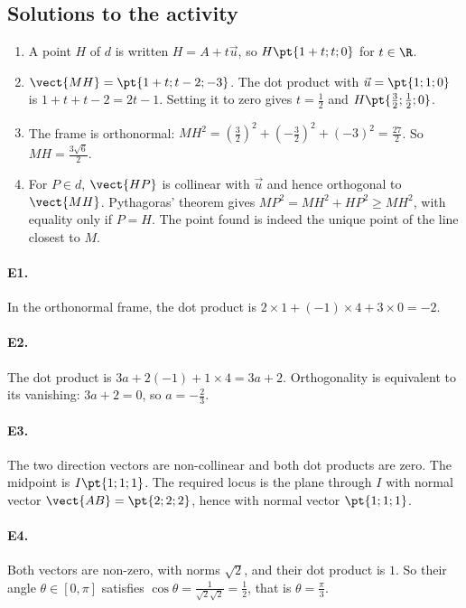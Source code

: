 \subsection{Solutions to the activity}\begin{enumerate}
\item A point $H$ of $d$ is written $H=A+t\vec u$, so $H\pt{1+t;t;0}$ for $t\in\R$.
\item $\vect{MH}=\pt{1+t;t-2;-3}$. The dot product with $\vec u=\pt{1;1;0}$ is $1+t+t-2=2t-1$. Setting it to zero gives $t=\frac{1}{2}$ and $H\pt{\frac{3}{2};\frac{1}{2};0}$.
\item The frame is orthonormal: $MH^2=(\frac{3}{2})^2+(-\frac{3}{2})^2+(-3)^2=\frac{27}{2}$. So $MH=\frac{3\sqrt{6}}{2}$.
\item For $P\in d$, $\vect{HP}$ is collinear with $\vec u$ and hence orthogonal to $\vect{MH}$. Pythagoras' theorem gives $MP^2=MH^2+HP^2\ge MH^2$, with equality only if $P=H$. The point found is indeed the unique point of the line closest to $M$.
\end{enumerate}

\paragraph{E1.}In the orthonormal frame, the dot product is $2\times1+(-1)\times4+3\times0=-2$.

\paragraph{E2.}The dot product is $3a+2(-1)+1\times4=3a+2$. Orthogonality is equivalent to its vanishing: $3a+2=0$, so $a=-\frac{2}{3}$.

\paragraph{E3.}The two direction vectors are non-collinear and both dot products are zero. The midpoint is $I\pt{1;1;1}$. The required locus is the plane through $I$ with normal vector $\vect{AB}=\pt{2;2;2}$, hence with normal vector $\pt{1;1;1}$.

\paragraph{E4.}Both vectors are non-zero, with norms $\sqrt2$, and their dot product is $1$. So their angle $\theta\in[0,\pi]$ satisfies $\cos \theta=\frac{1}{\sqrt2\sqrt2}=\frac{1}{2}$, that is $\theta=\frac{\pi}{3}$.

